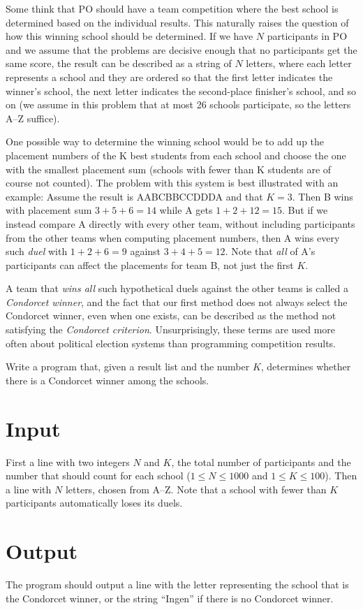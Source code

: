 
Some think that PO should have a team competition where the best school is determined based on the individual results. This naturally raises the question of how this winning school should be determined.
If we have $N$ participants in PO and we assume that the problems are decisive enough that no participants get the same score, the result can be described as a string of $N$ letters, where each letter represents a school and they are ordered so that the first letter indicates the winner's school, the next letter indicates the second-place finisher's school, and so on (we assume in this problem that at most 26 schools participate, so the letters A--Z suffice).

One possible way to determine the winning school would be to add up the placement numbers of the K best students from each school and choose the one with the smallest placement sum (schools with fewer than K students are of course not counted). The problem with this system is best illustrated with an example: Assume the result is AABCBBCCDDDA
and that $K=3$. Then B wins with placement sum $3+5+6=14$ while A gets $1+2+12=15$. But if we instead compare A directly with every other team, without including participants from the other teams when computing placement numbers, then A wins every such \emph{duel} with $1+2+6=9$ against $3+4+5=12$. Note that \emph{all} of A's participants can affect the placements for team B, not just the first $K$.

A team that \emph{wins all} such hypothetical duels against the other teams is called a \emph{Condorcet winner}, and the fact that our first method does not always select the Condorcet winner, even when one exists, can be described as the method not satisfying the \emph{Condorcet criterion}. Unsurprisingly, these terms are used more often about political election systems than programming competition results.

Write a program that, given a result list and the number $K$, determines whether there is a Condorcet winner among the schools.

\section*{Input}

First a line with two integers $N$ and $K$, the total number of participants and the number that should count for each school ($1\le N \le 1000$ and $1\le K \le 100$). Then a line with $N$ letters, chosen from A--Z. Note that a school with fewer than $K$ participants automatically loses its duels.

\section*{Output}

The program should output a line with the letter representing the school that is the Condorcet winner, or the string ``Ingen'' if there is no Condorcet winner.
